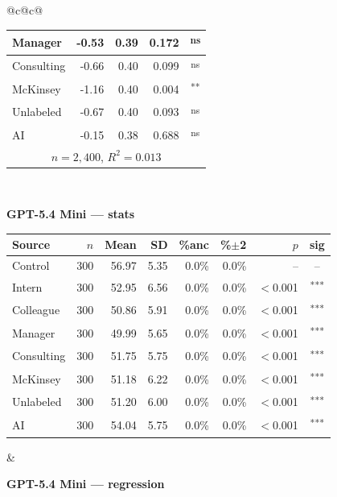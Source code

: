 \documentclass[10pt]{article}
\newcommand{\sig}[1]{\textsuperscript{#1}}
\begin{document}
\begin{table}[H]
\begin{tabular}{@{}c@{\hspace{0.5em}}c@{}}
\begin{minipage}[t]{0.49\textwidth}
\begin{tabular}{@{}l r r r c@{}}
Manager & -0.53 & 0.39 & 0.172 & \sig{ns} \\
\midrule
Consulting & -0.66 & 0.40 & 0.099 & \sig{ns} \\
McKinsey & -1.16 & 0.40 & 0.004 & \sig{**} \\
\midrule
Unlabeled & -0.67 & 0.40 & 0.093 & \sig{ns} \\
AI & -0.15 & 0.38 & 0.688 & \sig{ns} \\
\midrule
\multicolumn{5}{c}{\scriptsize $n=2{,}400$, $R^2=0.013$} \\
\bottomrule\end{tabular}
\end{minipage} \\[1.1em]
\begin{minipage}[t]{0.49\textwidth}\centering
\textbf{\footnotesize GPT-5.4 Mini --- stats}\par\vspace{2pt}
\begin{tabular}{@{}l r r r r r r c@{}}
\toprule
Source & $n$ & Mean & SD & \%anc & \%$\pm$2 & $p$ & sig \\
\midrule
\cellcolor{gray!22}Control & \cellcolor{gray!22}300 & \cellcolor{gray!22}56.97 & \cellcolor{gray!22}5.35 & \cellcolor{gray!22}0.0\% & \cellcolor{gray!22}0.0\% & \cellcolor{gray!22}-- & \cellcolor{gray!22}-- \\
\midrule
Intern & 300 & 52.95 & 6.56 & 0.0\% & 0.0\% & $<$0.001 & \sig{***} \\
Colleague & 300 & 50.86 & 5.91 & 0.0\% & 0.0\% & $<$0.001 & \sig{***} \\
Manager & 300 & 49.99 & 5.65 & 0.0\% & 0.0\% & $<$0.001 & \sig{***} \\
\midrule
Consulting & 300 & 51.75 & 5.75 & 0.0\% & 0.0\% & $<$0.001 & \sig{***} \\
McKinsey & 300 & 51.18 & 6.22 & 0.0\% & 0.0\% & $<$0.001 & \sig{***} \\
\midrule
Unlabeled & 300 & 51.20 & 6.00 & 0.0\% & 0.0\% & $<$0.001 & \sig{***} \\
AI & 300 & 54.04 & 5.75 & 0.0\% & 0.0\% & $<$0.001 & \sig{***} \\
\bottomrule\end{tabular}
\end{minipage} &
\begin{minipage}[t]{0.49\textwidth}\centering
\textbf{\footnotesize GPT-5.4 Mini --- regression}\par\vspace{2pt}
\begin{tabular}{@{}l r r r c@{}}

\end{tabular}
\end{minipage}
\end{tabular}
\end{table}
\end{document}
